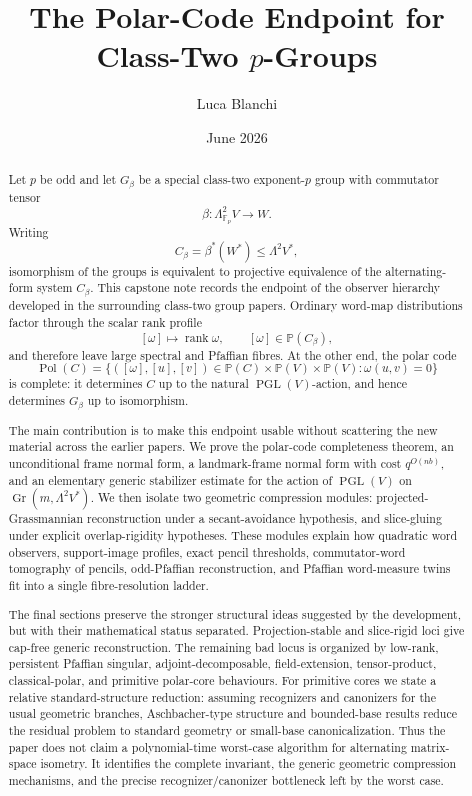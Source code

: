 \documentclass[11pt]{article}
\title{The Polar-Code Endpoint for Class-Two $p$-Groups}
\author{Luca Blanchi}
\date{June 2026}
\begin{document}
\maketitle

\begin{abstract}
Let $p$ be odd and let $G_\beta$ be a special class-two exponent-$p$ group with commutator tensor
\[
\beta:\Lambda^2_{\mathbb F_p}V\to W.
\]
Writing
\[
C_\beta=\beta^*(W^*)\le \Lambda^2V^*,
\]
isomorphism of the groups is equivalent to projective equivalence of the alternating-form system $C_\beta$. This capstone note records the endpoint of the observer hierarchy developed in the surrounding class-two group papers. Ordinary word-map distributions factor through the scalar rank profile
\[
[\omega]\mapsto \operatorname{rank}\omega,
\qquad [\omega]\in\mathbb P(C_\beta),
\]
and therefore leave large spectral and Pfaffian fibres. At the other end, the polar code
\[
\operatorname{Pol}(C)
=
\{([\omega],[u],[v])\in\mathbb P(C)\times\mathbb P(V)\times\mathbb P(V):
\omega(u,v)=0\}
\]
is complete: it determines $C$ up to the natural $\operatorname{PGL}(V)$-action, and hence determines $G_\beta$ up to isomorphism.

The main contribution is to make this endpoint usable without scattering the new material across the earlier papers. We prove the polar-code completeness theorem, an unconditional frame normal form, a landmark-frame normal form with cost $q^{O(nb)}$, and an elementary generic stabilizer estimate for the action of $\operatorname{PGL}(V)$ on $\operatorname{Gr}(m,\Lambda^2V^*)$. We then isolate two geometric compression modules: projected-Grassmannian reconstruction under a secant-avoidance hypothesis, and slice-gluing under explicit overlap-rigidity hypotheses. These modules explain how quadratic word observers, support-image profiles, exact pencil thresholds, commutator-word tomography of pencils, odd-Pfaffian reconstruction, and Pfaffian word-measure twins fit into a single fibre-resolution ladder.

The final sections preserve the stronger structural ideas suggested by the development, but with their mathematical status separated. Projection-stable and slice-rigid loci give cap-free generic reconstruction. The remaining bad locus is organized by low-rank, persistent Pfaffian singular, adjoint-decomposable, field-extension, tensor-product, classical-polar, and primitive polar-core behaviours. For primitive cores we state a relative standard-structure reduction: assuming recognizers and canonizers for the usual geometric branches, Aschbacher-type structure and bounded-base results reduce the residual problem to standard geometry or small-base canonicalization. Thus the paper does not claim a polynomial-time worst-case algorithm for alternating matrix-space isometry. It identifies the complete invariant, the generic geometric compression mechanisms, and the precise recognizer/canonizer bottleneck left by the worst case.
\end{abstract}
\end{document}
